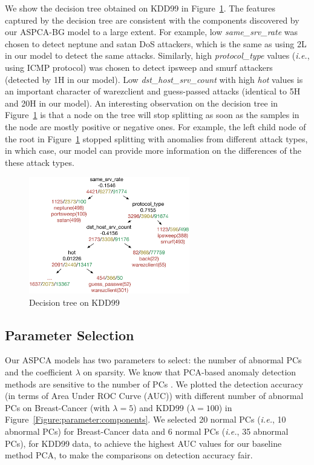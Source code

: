 We show the decision tree obtained on KDD99 in Figure~\ref{fig:tree:KDD}. The features captured by the decision tree are consistent with the components discovered by our ASPCA-BG model to a large extent. For example, low \emph{same\_srv\_rate} was chosen to detect neptune and satan DoS attackers, which is the same as using 2L in our model to detect the same attacks. Similarly, high \emph{protocol\_type} values ({\it i.e.}, using ICMP protocol) was chosen to detect ipsweep and smurf attackers (detected by 1H in our model). Low \emph{dst\_host\_srv\_count} with high \emph{hot} values is an important character of warezclient and guess-passed attacks  (identical to 5H and 20H in our model). An interesting observation on the decision tree in Figure~\ref{fig:tree:KDD} is that a node on the tree will stop splitting as soon as the samples in the node are mostly positive or negative ones. For example, the left child node of the root in Figure~\ref{fig:tree:KDD} stopped splitting with anomalies from different attack types, in which case, our model can provide more information on the differences of the these attack types.
\begin{figure}
\centering
	\includegraphics[width=70mm]{figure/new/KDD-DT}
	\caption{Decision tree on KDD99}
         \label{fig:tree:KDD}
\end{figure}


\subsection{Parameter Selection}
\label{sec:parameter}
Our ASPCA models has two parameters to select: the number of abnormal PCs and the coefficient $\lambda$ on sparsity. We know that PCA-based anomaly detection methods are sensitive to the number of PCs \cite{PCA-Sensitivity}. We plotted the detection accuracy (in terms of Area Under ROC Curve (AUC)) with different number of abnormal PCs on Breast-Cancer (with $\lambda=5$) and KDD99 ($\lambda=100$) in Figure~\ref{Figure:parameter:components}. We selected 20 normal PCs ({\it i.e.}, 10 abnormal PCs) for Breast-Cancer data and 6 normal PCs ({\it i.e.}, 35 abnormal PCs), for KDD99 data, to achieve the highest AUC values for our baseline method PCA, to make the comparisons on detection accuracy fair.

